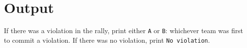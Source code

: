 \section*{Output}

If there was a violation in the rally, print either \texttt{A} or \texttt{B}: whichever team was first to
commit a violation. If there was no violation, print \texttt{No violation}.

